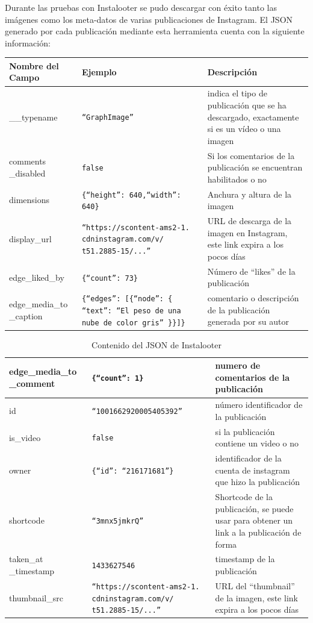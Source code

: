 Durante las pruebas con Instalooter se pudo descargar con éxito tanto las imágenes como los meta-datos de varias publicaciones de Instagram. El JSON generado por cada publicación mediante esta herramienta cuenta con la siguiente información:

\begin{table}[H]
    \hspace*{-1.5cm}
    \centering
    \begin{tabular}{|p{}|p{}|p{}|}
    \hline
    Nombre del Campo & Ejemplo & Descripción \\ \hline
    \_\_typename & \texttt{``GraphImage''} & indica el tipo de publicación que se ha descargado, exactamente si es un vídeo o una imagen \\ \hline
    comments \_disabled & \texttt{false} & Si los comentarios de la publicación se encuentran habilitados o no \\ \hline
    dimensions & \texttt{\{``height'': 640,``width'': 640\}} & Anchura y altura de la imagen \\ \hline
    display\_url & \texttt{``https://scontent-ams2-1.
    cdninstagram.com/v/ t51.2885-15/...''} & URL de descarga de la imagen en Instagram, este link expira a los pocos días \\ \hline
    edge\_liked\_by & \texttt{\{``count'': 73\}} & Número de ``likes'' de la publicación \\ \hline
    edge\_media\_to \_caption & \texttt{\{``edges'': {[}\{``node'': \{ ``text'': ``El peso de una nube de color gris'' \}\}{]}\}} & comentario o descripción de la publicación generada por su autor \\ \hline
    \end{tabular}
\end{table}
\begin{table}[H]
    \centering
    \begin{tabular}{|p{}|p{}|p{}|}
    \hline
    edge\_media\_to \_comment & \texttt{\{``count'': 1\}} & numero de comentarios de la publicación \\ \hline
    id & \texttt{``1001662920005405392''} & número identificador de la publicación \\ \hline
    is\_video & \texttt{false} & si la publicación contiene un video o no \\ \hline
    owner & \texttt{\{``id'': ``216171681''\}} & identificador de la cuenta de instagram que hizo la publicación \\ \hline
    shortcode & \texttt{``3mnx5jmkrQ''} & Shortcode de la publicación, se puede usar para obtener un link a la publicación de forma \\ \hline
    taken\_at \_timestamp & \texttt{1433627546} & timestamp de la publicación \\ \hline
    thumbnail\_src & \texttt{``https://scontent-ams2-1.
    cdninstagram.com/v/ t51.2885-15/...'' }& URL del ``thumbnail'' de la imagen, este link expira a los pocos días \\ \hline
    \end{tabular}
    \caption{Contenido del JSON de Instalooter}
    \label{tab:json_instalooter}
\end{table}

